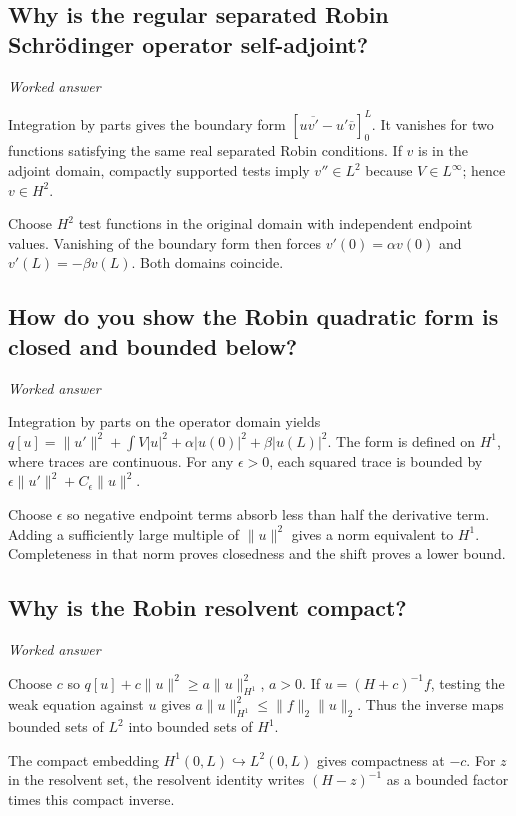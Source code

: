 \documentclass[11pt]{article}
\begin{document}
\subsection{Why is the regular separated Robin Schr\"{o}dinger operator self-adjoint?}
\label{problem:robin-adjoint}
\textit{Worked answer}

Integration by parts gives the boundary form \([u\overline{v'}-u'\overline v]_0^L\). It vanishes for two functions satisfying the same real separated Robin conditions. If \(v\) is in the adjoint domain, compactly supported tests imply \(v''\in L^2\) because \(V\in L^\infty\); hence \(v\in H^2\).

Choose \(H^2\) test functions in the original domain with independent endpoint values. Vanishing of the boundary form then forces \(v'(0)=\alpha v(0)\) and \(v'(L)=-\beta v(L)\). Both domains coincide.

\subsection{How do you show the Robin quadratic form is closed and bounded below?}
\label{problem:robin-form}
\textit{Worked answer}

Integration by parts on the operator domain yields \(q[u]=\|u'\|^2+\int V|u|^2+\alpha|u(0)|^2+\beta|u(L)|^2\). The form is defined on \(H^1\), where traces are continuous. For any \(\epsilon>0\), each squared trace is bounded by \(\epsilon\|u'\|^2+C_\epsilon\|u\|^2\).

Choose \(\epsilon\) so negative endpoint terms absorb less than half the derivative term. Adding a sufficiently large multiple of \(\|u\|^2\) gives a norm equivalent to \(H^1\). Completeness in that norm proves closedness and the shift proves a lower bound.

\subsection{Why is the Robin resolvent compact?}
\label{problem:robin-resolvent}
\textit{Worked answer}

Choose \(c\) so \(q[u]+c\|u\|^2\ge a\|u\|_{H^1}^2\), \(a>0\). If \(u=(H+c)^{-1}f\), testing the weak equation against \(u\) gives \(a\|u\|_{H^1}^2\le\|f\|_2\|u\|_2\). Thus the inverse maps bounded sets of \(L^2\) into bounded sets of \(H^1\).

The compact embedding \(H^1(0,L)\hookrightarrow L^2(0,L)\) gives compactness at \(-c\). For \(z\) in the resolvent set, the resolvent identity writes \((H-z)^{-1}\) as a bounded factor times this compact inverse.
\end{document}
